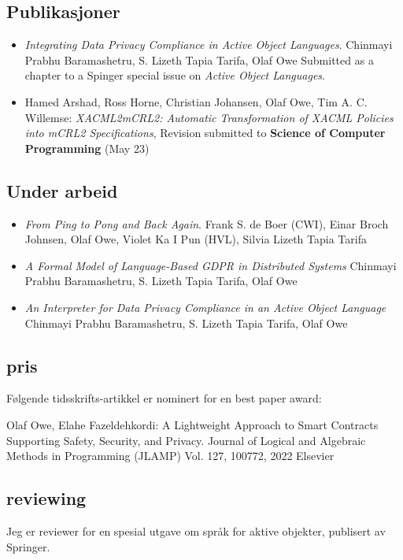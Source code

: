 \documentclass[11pt]{article}
\begin{document}
\subsection{Publikasjoner}
\label{sec-2-1}
\begin{itemize}
\item \emph{Integrating Data Privacy Compliance in Active Object Languages}.
Chinmayi Prabhu Baramashetru, S. Lizeth Tapia Tarifa, Olaf Owe
Submitted as a chapter to a Spinger special issue on \emph{Active Object Languages}.

\item Hamed Arshad, Ross Horne, Christian Johansen, Olaf Owe, Tim
 A. C. Willemse: 
\emph{XACML2mCRL2: Automatic Transformation of XACML Policies into mCRL2 Specifications},
 Revision submitted to \textbf{Science of Computer  Programming} (May 23)
\end{itemize}

\subsection{Under arbeid}
\label{sec-2-2}

\begin{itemize}
\item \emph{From Ping to Pong and Back Again}.
Frank S. de Boer (CWI), Einar Broch Johnsen, Olaf Owe,
Violet Ka I Pun  (HVL),  Silvia Lizeth Tapia Tarifa

\item \emph{A Formal Model of Language-Based GDPR in Distributed Systems}
Chinmayi Prabhu Baramashetru, S. Lizeth Tapia Tarifa,
Olaf Owe

\item \emph{An Interpreter for  Data Privacy Compliance in an Active Object Language}
Chinmayi Prabhu Baramashetru, S. Lizeth Tapia Tarifa,
Olaf Owe
\end{itemize}

\subsection{pris}
\label{sec-2-3}

Følgende tidsskrifts-artikkel er nominert for en best paper award:

Olaf Owe, Elahe Fazeldehkordi: A Lightweight Approach to Smart Contracts Supporting Safety, Security, and
Privacy.  Journal of Logical and Algebraic Methods in Programming (JLAMP) Vol. 127, 100772, 2022 Elsevier 
\subsection{reviewing}
\label{sec-2-4}
Jeg  er reviewer for en spesial utgave 
om språk for aktive objekter, publisert av Springer.
\end{document}
